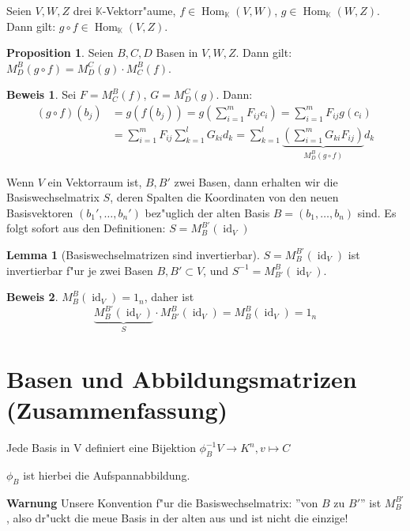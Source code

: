 \documentclass[fontsize=11pt,paper=a4,BCOR=0mm,DIV=11,automark,headsepline]{scrbook}
\DeclareMathOperator{\mHom}{Hom}
\DeclareMathOperator{\mId}{id}
\theoremstyle{remark}
\theoremstyle{definition}
\newtheorem*{proposition}{Proposition}
\newtheorem{lemma}{Lemma}[section]
\theoremstyle{proof}
\newtheorem*{prof}{Beweis}
\theoremstyle{remark}
\begin{document}
Seien \(V, W, Z\) drei \(\mathbb{K}\)-Vektorr"aume, \(f \in \mHom_\mathbb{K}(V, W)\), \(g \in \mHom_\mathbb{K}(W,Z)\). Dann gilt: \(g\circ f \in \mHom_\mathbb{K}(V,Z)\).

\begin{proposition}
	 Seien \(B,C,D\) Basen in
	\(V,W,Z\). Dann gilt: \(M^B_D(g\circ f) = M^C_D(g)\cdot M^B_C(f)\).
\end{proposition}
\begin{prof}
 Sei \(F = M^B_C(f)\), \(G = M^C_D(g)\). Dann:
 \begin{align*}
 (g\circ f)(b_j) &= g(f(b_j)) = g\left(\sum_{i=1}^m F_{ij}c_i\right) = \sum_{i=1}^mF_{ij}g(c_i) \\&= \sum_{i=1}^m F_{ij}\sum_{k=1}^lG_{ki}d_k = \sum_{k=1}^l\underbrace{\left(\sum_{i=1}^mG_{ki}F_{ij}\right)}_{M^B_D(g\circ f)}d_k
 \end{align*}
\end{prof}

Wenn \(V\) ein Vektorraum ist, \(B,B'\) zwei Basen, dann erhalten wir die
 Basiswechselmatrix \(S\), deren Spalten die Koordinaten von den neuen
 Basisvektoren \((b_1', \dots, b_n')\) bez"uglich der alten Basis \(B = (b_1,
 \dots, b_n)\) sind. Es folgt sofort aus den Definitionen:
 \(S=M^{B'}_B(\mId_V)\)
 
\begin{lemma}[Basiswechselmatrizen sind invertierbar]
	\(S = M^{B'}_B(\mId_V)\) ist invertierbar f"ur je zwei Basen \(B, B' \subset V\), und \(S^{-1} = M^B_{B'}(\mId_V)\).
\end{lemma}
\begin{prof}
	\(M^B_B(\mId_V)=1_n\), daher ist
	\[\underbrace{M^{B'}_B(\mId_V)}_{S}\cdot M^B_{B'}(\mId_V) = M^B_B(\mId_V) = 1_n \]
\end{prof}


\section{Basen und Abbildungsmatrizen (Zusammenfassung)}
\label{sec:baab}
Jede Basis in V definiert eine Bijektion $\phi_B^{-1}V\rightarrow K^n, v\mapsto C$
\begin{relation}
  $\phi_B$ ist hierbei die Aufspannabbildung.  
\end{relation}

\textbf{Warnung} Unsere Konvention f"ur die Basiswechselmatrix: ''von $B$ zu
$B'$'' ist $M^{B'}_B$, also dr"uckt die meue Basis in der alten aus und ist
nicht die einzige!
\end{document}
